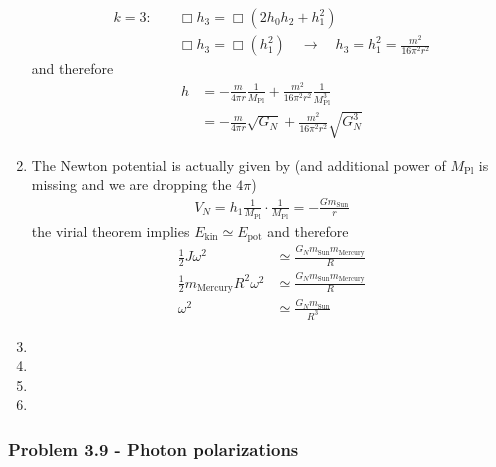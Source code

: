 \documentclass[10pt,a4paper]{article}
\theoremstyle{definition}
\begin{document}
\begin{enumerate}[label=(\alph*)]
\begin{align}
k=3:&\quad\Box h_3=\Box(2h_0h_2+h_1^2)\\
    &\quad\Box h_3=\Box(h_1^2)\quad\rightarrow\quad h_3=h_1^2=\frac{m^2}{16\pi^2r^2}
\end{align}
and therefore
\begin{align}
h&=-\frac{m}{4\pi r}\frac{1}{M_\text{Pl}}+\frac{m^2}{16\pi^2r^2}\frac{1}{M_\text{Pl}^3}\\
&=-\frac{m}{4\pi r}\sqrt{G_N}+\frac{m^2}{16\pi^2r^2}\sqrt{G_N^3}
\end{align}
\item 
The Newton potential is actually given by (and additional power of $M_\text{Pl}$ is missing and we are dropping the $4\pi$)
\begin{align}
V_N=h_1\frac{1}{M_\text{Pl}}\cdot\frac{1}{M_\text{Pl}}=-\frac{Gm_\text{Sun}}{r}
\end{align}
the virial theorem implies $E_\text{kin}\simeq E_\text{pot}$ and therefore
\begin{align}
\frac{1}{2}J\omega^2&\simeq \frac{G_N m_\text{Sun} m_\text{Mercury}}{R}\\
\frac{1}{2}m_\text{Mercury}R^2\omega^2&\simeq \frac{G_N m_\text{Sun} m_\text{Mercury}}{R}\\
\omega^2&\simeq\frac{G_Nm_\text{Sun}}{R^3}
\end{align}

\item 
\item 
\item 
\item 
\end{enumerate}

\subsubsection{Problem 3.9 - Photon polarizations}
\end{document}
